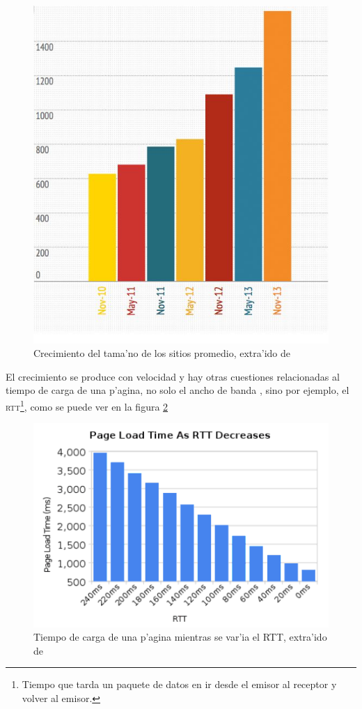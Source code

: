 \documentclass[a4paper,11pt,twocolumn]{article}
\begin{document}
\begin{figure}[h!]
  	\centering
	\includegraphics[scale=0.4]{151tammy}
	\caption{\small Crecimiento del tama'no de los sitios promedio, extra'ido de \cite{tammy}}
	\label{average}
\end{figure}

El crecimiento se produce con velocidad \cite{averageWebPage} y hay otras cuestiones relacionadas al tiempo de carga de una p'agina, no solo el ancho de banda \cite{moreBand}, sino por ejemplo, el \textsc{rtt}\footnote{Tiempo que tarda un paquete de datos en ir desde el emisor al receptor y volver al emisor.}, como se puede ver en la figura \ref{rttBelsche}

\begin{figure}[h!]
  	\centering
	\includegraphics[scale=0.5]{belsche}
	\caption{\small Tiempo de carga de una p'agina mientras se var'ia el RTT, extra'ido de \cite{moreBand}}
	\label{rttBelsche}
\end{figure}
\end{document}

